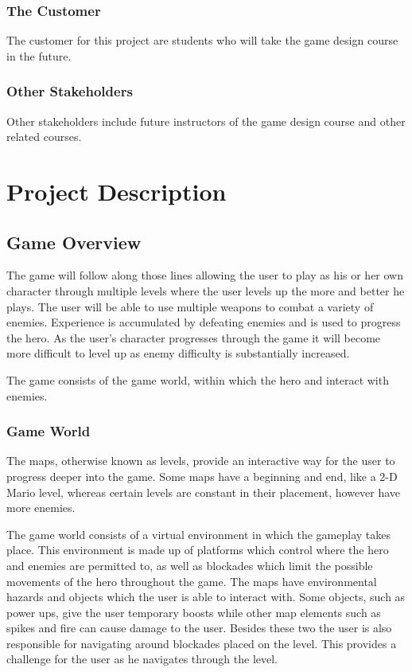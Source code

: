 \documentclass[12pt, titlepage]{article}
\begin{document}
\subsubsection{The Customer}
The customer for this project are students who will take the game design course in the future.
\subsubsection{Other Stakeholders}
Other stakeholders include future instructors of the game design course and other related courses.
\section{Project Description}
\subsection{Game Overview}
The game will follow along those lines allowing the user to play as his or her own character through multiple levels where the user levels up the more and better he plays. The user will be able to use multiple weapons to combat a variety of enemies.  Experience is accumulated by defeating enemies and is used to progress the hero. As the user’s character progresses through the game it will become more difficult to level up as enemy difficulty is substantially increased.

The game consists of the game world, within which the hero and interact with enemies.

\subsubsection{Game World}
The maps, otherwise known as levels, provide an interactive way for the user to progress deeper into the game. Some maps have a beginning and end, like a 2-D Mario level, whereas certain levels are constant in their placement, however have more enemies.

The game world consists of a virtual environment in which the gameplay takes place.  This environment is made up of platforms which control where the hero and enemies are permitted to, as well as blockades which limit the possible movements of the hero throughout the game.   The maps have environmental hazards and objects which the user is able to interact with. Some objects, such as power ups, give the user temporary boosts while other map elements such as spikes and fire can cause damage to the user. Besides these two the user is also responsible for navigating around blockades placed on the level. This provides a challenge for the user as he navigates through the level.
\end{document}
